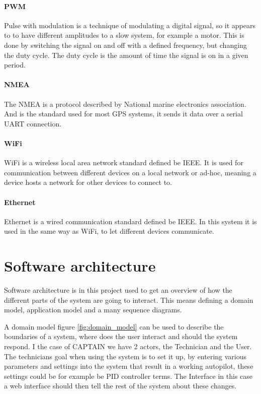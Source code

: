 \paragraph{PWM}
Pulse with modulation is a technique of modulating a digital signal, so it appears to to have different amplitudes to a slow system, for example a motor. This is done by switching the signal on and off with a defined frequency, but changing the duty cycle. The duty cycle is the amount of time the signal is on in a given period.\cite{PWM}

\paragraph{NMEA}
The NMEA is a protocol described by National marine electronics association. And is the standard used for most GPS systems, it sends it data over a serial UART connection. \cite{NMEA}

\paragraph{WiFi}
WiFi is a wireless local area network standard defined be IEEE\cite{WIFI}. It is used for communication between different devices on a local network or ad-hoc, meaning a device hosts a network for other devices to connect to. 

\paragraph{Ethernet}
Ethernet is a wired communication standard defined be IEEE\cite{ethernet}. In this system it is used in the same way as WiFi, to let different devices communicate.

\section{Software architecture}
\label{sec:soft-architecture}
Software architecture is in this project used to get an overview of how the different parts of the system are going to interact.
This means defining a domain model, application model and a many sequence diagrams. 

A domain model figure \ref{fig:domain_model} can be used to describe the boundaries of a system, where does the user interact and should the system respond. I the case of CAPTAIN we have 2 actors, the Technician and the User. The technicians goal when using the system is to set it up, by entering various parameters and settings into the system that result in a working autopilot, these settings could be for example be PID controller terms. The Interface in this case a web interface should then tell the rest of the system about these changes.


